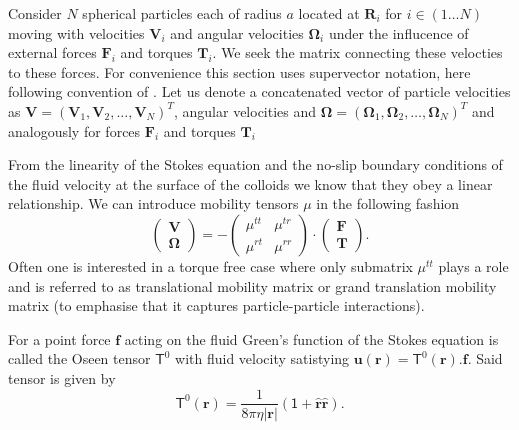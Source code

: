 \documentclass{doctoral}
\newcommand{\mm}[1]{\bm{\mathsf{#1}}} %
\begin{document}
Consider $N$ spherical particles each of radius $a$ located at $\bm{R}_i$ for $i \in (1 \dots N)$ moving with velocities $\bm{V}_i$ and angular velocities $\bm{\Omega}_i$ under the influcence of external forces $\bm{F}_i$ and torques $\bm{T}_i$.
We seek the matrix connecting these velocties to these forces.
For convenience this section uses supervector notation, here following convention of \cite{Nagele_2013}.
Let us denote a concatenated vector of particle velocities as $\bm{V} = (\bm{V}_1,\bm{V}_2,\dots,\bm{V}_N)^{T}$, angular velocities and $\bm{\Omega} = (\bm{\Omega}_1,\bm{\Omega}_2,\dots,\bm{\Omega}_N)^{T}$ and analogously for forces $\bm{F}_i$ and torques $\bm{T}_i$ 

From the linearity of the Stokes equation and the no-slip boundary conditions of the fluid velocity at the surface of the colloids we know that they obey a linear relationship.
We can introduce mobility tensors $\mm{\mu}$ in the following fashion
\begin{equation}
    \begin{pmatrix}
        \bm{V} \\
        \bm{\Omega}
    \end{pmatrix}
    = -
    \begin{pmatrix}
        \mm{\mu}^{tt} & \mm{\mu}^{tr} \\
        \mm{\mu}^{rt} & \mm{\mu}^{rr}
    \end{pmatrix}
    \cdot
    \begin{pmatrix}
        \bm{F} \\
        \bm{T}
    \end{pmatrix}
    .
    \label{eqn:mobility-matrix-definition}
\end{equation}
Often one is interested in a torque free case where only submatrix $\mm{\mu}^{tt}$ plays a role and is referred to as translational mobility matrix or grand translation mobility matrix (to emphasise that it captures particle-particle interactions).

For a point force $\bm{f}$ acting on the fluid Green's function of the Stokes equation is called the Oseen tensor $\mm{T}^0$ with fluid velocity satistying $\bm{u}(\bm{r}) = \mm{T}^{0}(\bm{r}).
    \bm{f}$.
Said tensor is given by
\begin{equation}
    \mm{T}^{0}(\bm{r}) = \frac{1}{8\pi\eta |\bm{r}|} \left( \mm{1} + \bm{\hat{r}}\bm{\hat{r}}\right).
\end{equation}
\end{document}
